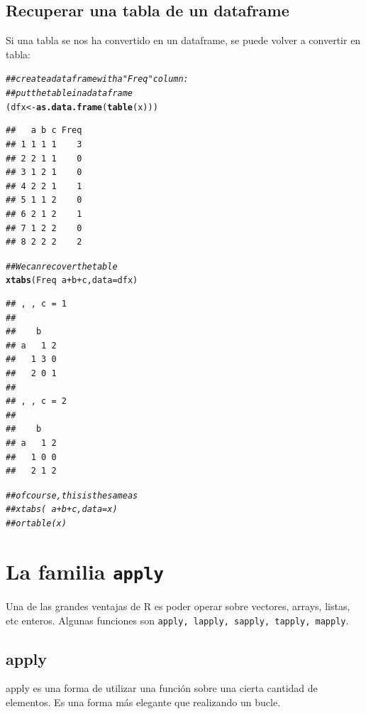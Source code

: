 \documentclass{config/apuntes}\usepackage[]{graphicx}\usepackage[]{xcolor}
\makeatletter
\newcommand{\hlcom}[1]{\textcolor[rgb]{0.678,0.584,0.686}{\textit{#1}}}%
\newcommand{\hlopt}[1]{\textcolor[rgb]{0,0,0}{#1}}%
\newcommand{\hldef}[1]{\textcolor[rgb]{0.345,0.345,0.345}{#1}}%
\newcommand{\hlkwb}[1]{\textcolor[rgb]{0.69,0.353,0.396}{#1}}%
\newcommand{\hlkwc}[1]{\textcolor[rgb]{0.333,0.667,0.333}{#1}}%
\newcommand{\hlkwd}[1]{\textcolor[rgb]{0.737,0.353,0.396}{\textbf{#1}}}%
\newenvironment{kframe}{%
 \def\at@end@of@kframe{}%
 \ifinner\ifhmode%
  \def\at@end@of@kframe{\end{minipage}}%
  \begin{minipage}{\columnwidth}%
 \fi\fi%
 \def\FrameCommand##1{\hskip\@totalleftmargin \hskip-\fboxsep
 \colorbox{shadecolor}{##1}\hskip-\fboxsep
     \hskip-\linewidth \hskip-\@totalleftmargin \hskip\columnwidth}%
 \MakeFramed {\advance\hsize-\width
   \@totalleftmargin\z@ \linewidth\hsize
   \@setminipage}}%
 {\par\unskip\endMakeFramed%
 \at@end@of@kframe}
\newenvironment{knitrout}{}{} %
\newcommand{\code}[1]{\texttt{#1}}
\makeatother
\begin{document}
\subsection{Recuperar una tabla de un dataframe}
Si una tabla se nos ha convertido en un dataframe, se puede volver a convertir en tabla:

\begin{knitrout}
\color{fgcolor}\begin{kframe}
\begin{alltt}
\hlcom{## create a data frame with a "Freq" column:}
\hlcom{## put the table in a data frame}
\hldef{(dfx} \hlkwb{<-} \hlkwd{as.data.frame}\hldef{(}\hlkwd{table}\hldef{(x)))}
\end{alltt}
\begin{verbatim}
##   a b c Freq
## 1 1 1 1    3
## 2 2 1 1    0
## 3 1 2 1    0
## 4 2 2 1    1
## 5 1 1 2    0
## 6 2 1 2    1
## 7 1 2 2    0
## 8 2 2 2    2
\end{verbatim}
\begin{alltt}
\hlcom{## We can recover the table}
\hlkwd{xtabs}\hldef{(Freq} \hlopt{~} \hldef{a} \hlopt{+} \hldef{b} \hlopt{+} \hldef{c,} \hlkwc{data} \hldef{= dfx)}
\end{alltt}
\begin{verbatim}
## , , c = 1
## 
##    b
## a   1 2
##   1 3 0
##   2 0 1
## 
## , , c = 2
## 
##    b
## a   1 2
##   1 0 0
##   2 1 2
\end{verbatim}
\begin{alltt}
\hlcom{## of course, this is the same as}
\hlcom{## xtabs(~ a + b + c, data = x)}
\hlcom{## or table(x)}
\end{alltt}
\end{kframe}
\end{knitrout}

\section{La familia \code{apply}}
Una de las grandes ventajas de R es poder operar sobre vectores, arrays, listas, etc enteros. Algunas funciones son \code{apply, lapply, sapply, tapply, mapply}. 

\subsection{apply}
apply es una forma de utilizar una función sobre una cierta cantidad de elementos. Es una forma más elegante que realizando un bucle. 
\end{document}
